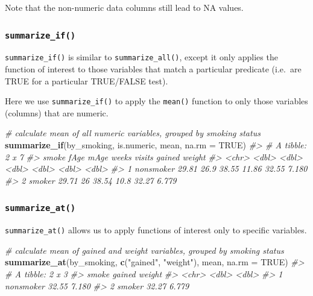 \documentclass[]{book}
\newenvironment{Shaded}{\begin{snugshade}}{\end{snugshade}}
\newcommand{\CommentTok}[1]{\textcolor[rgb]{0.56,0.35,0.01}{\textit{#1}}}
\newcommand{\DataTypeTok}[1]{\textcolor[rgb]{0.13,0.29,0.53}{#1}}
\newcommand{\KeywordTok}[1]{\textcolor[rgb]{0.13,0.29,0.53}{\textbf{#1}}}
\newcommand{\NormalTok}[1]{#1}
\newcommand{\OtherTok}[1]{\textcolor[rgb]{0.56,0.35,0.01}{#1}}
\newcommand{\StringTok}[1]{\textcolor[rgb]{0.31,0.60,0.02}{#1}}
\theoremstyle{definition}
\theoremstyle{definition}
\theoremstyle{definition}
\theoremstyle{remark}
\begin{document}
Note that the non-numeric data columns still lead to NA values.

\hypertarget{summarize_if}{%
\subsubsection{\texorpdfstring{\texttt{summarize\_if()}}{summarize\_if()}}\label{summarize_if}}

\texttt{summarize\_if()} is similar to \texttt{summarize\_all()}, except
it only applies the function of interest to those variables that match a
particular predicate (i.e.~are TRUE for a particular TRUE/FALSE test).

Here we use \texttt{summarize\_if()} to apply the \texttt{mean()}
function to only those variables (columns) that are numeric.

\begin{Shaded}
\begin{Highlighting}[]
\CommentTok{# calculate mean of all numeric variables, grouped by smoking status}
\KeywordTok{summarize_if}\NormalTok{(by_smoking, is.numeric, mean, }\DataTypeTok{na.rm =} \OtherTok{TRUE}\NormalTok{)}
\CommentTok{#> # A tibble: 2 x 7}
\CommentTok{#>   smoke      fAge  mAge weeks visits gained weight}
\CommentTok{#>   <chr>     <dbl> <dbl> <dbl>  <dbl>  <dbl>  <dbl>}
\CommentTok{#> 1 nonsmoker 29.81  26.9 38.55  11.86  32.55  7.180}
\CommentTok{#> 2 smoker    29.71  26   38.54  10.8   32.27  6.779}
\end{Highlighting}
\end{Shaded}

\hypertarget{summarize_at}{%
\subsubsection{\texorpdfstring{\texttt{summarize\_at()}}{summarize\_at()}}\label{summarize_at}}

\texttt{summarize\_at()} allows us to apply functions of interest only
to specific variables.

\begin{Shaded}
\begin{Highlighting}[]
\CommentTok{# calculate mean of gained and weight variables, grouped by smoking status}
\KeywordTok{summarize_at}\NormalTok{(by_smoking, }\KeywordTok{c}\NormalTok{(}\StringTok{"gained"}\NormalTok{, }\StringTok{"weight"}\NormalTok{), mean, }\DataTypeTok{na.rm =} \OtherTok{TRUE}\NormalTok{)}
\CommentTok{#> # A tibble: 2 x 3}
\CommentTok{#>   smoke     gained weight}
\CommentTok{#>   <chr>      <dbl>  <dbl>}
\CommentTok{#> 1 nonsmoker  32.55  7.180}
\CommentTok{#> 2 smoker     32.27  6.779}
\end{Highlighting}
\end{Shaded}
\end{document}
